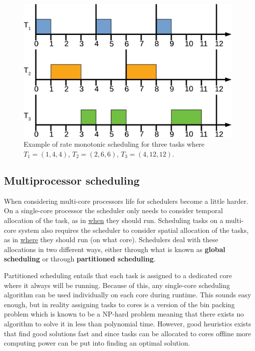 \documentclass{kththesis}
\begin{document}
\begin{figure}

    \centering

    \includegraphics[width=0.8\linewidth]{images/rate-monotonic-scheduling.pdf}

    \caption{Example of rate monotonic scheduling for three tasks where $T_1=(1, 4, 4)$, $T_2=(2, 6,
    6)$, $T_3=(4, 12, 12)$.}

    \label{fig:rate_monotonic_scheduling}

\end{figure}


\subsection{Multiprocessor scheduling} \label{subsec:multiprocessor_scheduling}

When considering multi-core processors life for schedulers become a little harder. On a single-core
processor the scheduler only needs to consider temporal allocation of the task, as in
\underline{when} they should run. Scheduling tasks on a multi-core system also requires the
scheduler to consider spatial allocation of the tasks, as in \underline{where} they should run
(on what core). Schedulers deal with these allocations in two different ways, either through what is
known as \textbf{global scheduling} or through \textbf{partitioned scheduling}. 

Partitioned scheduling entails that each task is assigned to a dedicated core where it always will
be running. Because of this, any single-core scheduling algorithm can be used individually on each core during
runtime. This sounds easy enough, but in reality assigning tasks to cores is a version of the bin
packing problem which is known to be a NP-hard problem meaning that there exists no algorithm to
solve it in less than polynomial time. However, good heuristics exists that find good solutions fast
and since tasks can be allocated to cores offline more computing power can be put into finding an
optimal solution.
\end{document}
